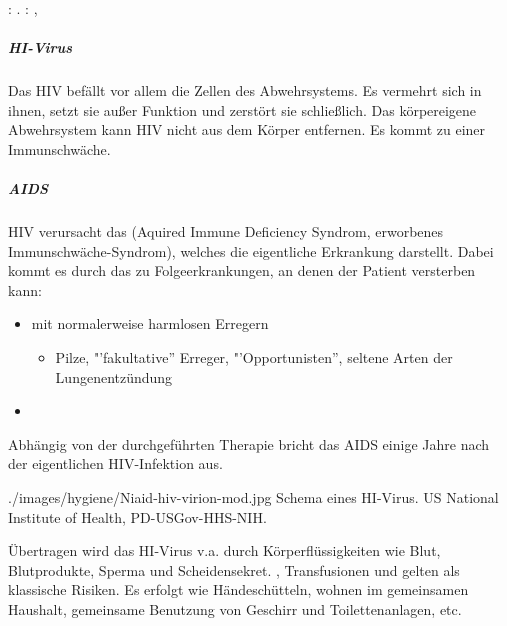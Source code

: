 : . 
: ,

{
\subparagraph{HI-Virus} Das HIV befällt vor allem die Zellen des
Abwehrsystems. Es vermehrt sich in ihnen, setzt sie außer Funktion und zerstört sie schließlich. Das körpereigene Abwehrsystem kann HIV nicht aus dem Körper
    entfernen.
Es kommt zu einer Immunschwäche.

\subparagraph{AIDS} HIV verursacht das  (Aquired Immune Deficiency
Syndrom, erworbenes Immunschwäche-Syndrom), welches die
eigentliche Erkrankung darstellt. Dabei kommt es durch das
 zu Folgeerkrankungen, an denen der Patient versterben kann:

\begin{itemize}
  \item {} mit normalerweise harmlosen
  Erregern
  \begin{itemize}
    \item Pilze, "'fakultative{\textquotedblright} Erreger,
    "'Opportunisten{\textquotedblright}, seltene Arten der
    Lungenentzündung
  \end{itemize}
  \item {}
\end{itemize}

Abhängig von der durchgeführten Therapie bricht das AIDS
einige Jahre nach der eigentlichen HIV-Infektion aus.
}{
}
{./images/hygiene/Niaid-hiv-virion-mod.jpg}
{Schema
eines HI-Virus.}
{US National Institute of Health, PD-USGov-HHS-NIH.}









{
Übertragen wird das HI-Virus v.a. durch Körperflüssigkeiten
wie Blut, Blutprodukte, Sperma und Scheidensekret.
, Transfusionen und
 gelten als klassische Risiken.
Es erfolgt  wie Händeschütteln, wohnen im
gemeinsamen Haushalt, gemeinsame Benutzung von Geschirr und
Toilettenanlagen, etc.
}{
}
{}
{}
{}

